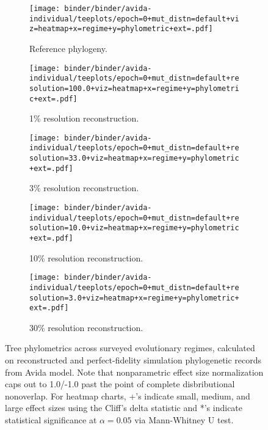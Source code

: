 \begin{figure*}
  \centering
  \begin{subfigure}[b]{\textwidth}
    \texttt{[image: binder/binder/avida-individual/teeplots/epoch=0+mut\_distn=default+viz=heatmap+x=regime+y=phylometric+ext=.pdf]}
    \caption{Reference phylogeny.}
  \end{subfigure}

\begin{subfigure}[b]{\textwidth}
  \texttt{[image: binder/binder/avida-individual/teeplots/epoch=0+mut\_distn=default+resolution=100.0+viz=heatmap+x=regime+y=phylometric+ext=.pdf]}
  \caption{1\% resolution reconstruction.}
\end{subfigure}

\begin{subfigure}[b]{\textwidth}
  \texttt{[image: binder/binder/avida-individual/teeplots/epoch=0+mut\_distn=default+resolution=33.0+viz=heatmap+x=regime+y=phylometric+ext=.pdf]}
  \caption{3\% resolution reconstruction.}
\end{subfigure}

\begin{subfigure}[b]{\textwidth}
  \texttt{[image: binder/binder/avida-individual/teeplots/epoch=0+mut\_distn=default+resolution=10.0+viz=heatmap+x=regime+y=phylometric+ext=.pdf]}
  \caption{10\% resolution reconstruction.}
\end{subfigure}

\begin{subfigure}[b]{\textwidth}
  \texttt{[image: binder/binder/avida-individual/teeplots/epoch=0+mut\_distn=default+resolution=3.0+viz=heatmap+x=regime+y=phylometric+ext=.pdf]}
  \caption{30\% resolution reconstruction.}
\end{subfigure}

  \caption{
Tree phylometrics across surveyed evolutionary regimes, calculated on reconstructed and perfect-fidelity simulation phylogenetic records from Avida model.
Note that nonparametric effect size normalization caps out to 1.0/-1.0 past the point of complete disbributional nonoverlap.
For heatmap charts, +'s indicate small, medium, and large effect sizes using the Cliff's delta statistic and *'s indicate statistical significance at $\alpha = 0.05$ via Mann-Whitney U test.
  }
  \label{fig:reconstructed-tree-phylometrics-progressive-heatmap-avida}
\end{figure*}